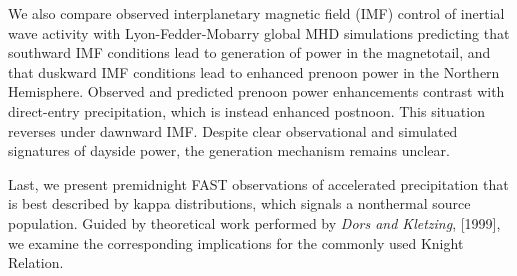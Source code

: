 We also compare observed interplanetary magnetic field (IMF) control
of inertial \Alf wave activity with Lyon-Fedder-Mobarry global MHD
simulations predicting that southward IMF conditions lead to
generation of \Alfic power in the magnetotail, and that duskward IMF
conditions lead to enhanced prenoon \Alfic power in the Northern
Hemisphere. Observed and predicted prenoon \Alfic power enhancements
contrast with direct-entry precipitation, which is instead enhanced
postnoon. This situation reverses under dawnward IMF. Despite clear
observational and simulated signatures of dayside \Alfic power, the
generation mechanism remains unclear.

Last, we present premidnight FAST observations of accelerated
precipitation that is best described by kappa distributions, which
signals a nonthermal source population. Guided by theoretical work
performed by \textsl{Dors and Kletzing}, [1999], we examine the
corresponding implications for the commonly used Knight Relation.



